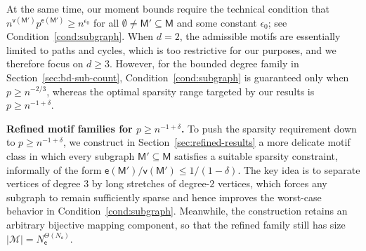 \documentclass[letterpaper,11pt]{article}
\theoremstyle{definition}
\newcommand{\maM}{\mathcal{M}}
\newcommand{\en}{\mathsf{{e}}}
\newcommand{\vn}{\mathsf{{v}}}
\newcommand{\sfM}{{\mathsf{M}}}
\newcommand{\sfe}{{\mathsf{e}}}
\begin{document}
At the same time, our moment bounds require the technical condition that $n^{\vn(\sfM')}p^{\en(\sfM')}\ge n^{\epsilon_0}$ for all $\emptyset\neq \sfM'\subseteq \sfM$ and some constant $\epsilon_0$; see Condition~\ref{cond:subgraph}.
When $d=2$, the admissible motifs are essentially limited to paths and cycles, which is too restrictive for our purposes, and we therefore focus on $d\ge 3$.
However, for the bounded degree family in Section~\ref{sec:bd-sub-count}, Condition~\ref{cond:subgraph} is guaranteed only when $p\ge n^{-2/3}$, whereas the optimal sparsity range targeted by our results is $p\ge n^{-1+\delta}$.

\noindent\textbf{Refined motif families for $p\ge n^{-1+\delta}$.}
To push the sparsity requirement down to $p\ge n^{-1+\delta}$, we construct in Section~\ref{sec:refined-results} a more delicate motif class in which every subgraph $\sfM'\subseteq \sfM$ satisfies a suitable sparsity constraint, informally of the form $\en(\sfM')/\vn(\sfM')\le 1/(1-\delta)$.
The key idea is to separate vertices of degree $3$ by long stretches of degree-$2$ vertices, which forces any subgraph to remain sufficiently sparse and hence improves the worst-case behavior in Condition~\ref{cond:subgraph}.
Meanwhile, the construction retains an arbitrary bijective mapping component, so that the refined family still has size $|\maM| = N_\sfe^{\Theta(N_\sfe)}$.

\end{document}
